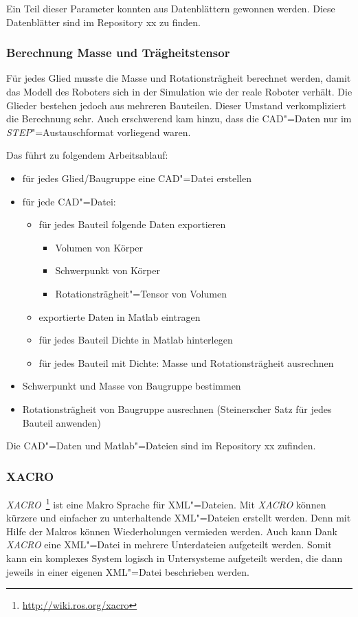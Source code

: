 Ein Teil dieser Parameter konnten aus Datenblättern gewonnen werden.
Diese Datenblätter sind im Repository xx zu finden. %

\subsubsection{Berechnung Masse und Trägheitstensor}
Für jedes Glied musste die Masse und Rotationsträgheit berechnet werden, damit das Modell des Roboters sich in der Simulation wie der reale Roboter verhält.
Die Glieder bestehen jedoch aus mehreren Bauteilen.
Dieser Umstand verkompliziert die Berechnung sehr.
Auch erschwerend kam hinzu, dass die CAD"=Daten nur im \textit{STEP}"=Austauschformat vorliegend waren.

Das führt zu folgendem Arbeitsablauf:
\begin{itemize}
\item für jedes Glied/Baugruppe eine CAD"=Datei erstellen
\item für jede CAD"=Datei:
\begin{itemize}
\item für jedes Bauteil folgende Daten exportieren
\begin{itemize}
\item Volumen von Körper
\item Schwerpunkt von Körper
\item Rotationsträgheit"=Tensor von Volumen
\end{itemize}
\item exportierte Daten in Matlab eintragen
\item für jedes Bauteil Dichte in Matlab hinterlegen
\item für jedes Bauteil mit Dichte: Masse und Rotationsträgheit ausrechnen  
\end{itemize}
\item Schwerpunkt und Masse von Baugruppe bestimmen
\item Rotationsträgheit von Baugruppe ausrechnen (Steinerscher Satz für jedes Bauteil anwenden)
\end{itemize}

Die CAD"=Daten und Matlab"=Dateien sind im Repository xx zufinden.

\subsubsection{XACRO}
\label{chap:xacro}
\textit{XACRO}~\footnote{\url{http://wiki.ros.org/xacro}} ist eine Makro Sprache für XML"=Dateien.
Mit \textit{XACRO} können kürzere und einfacher zu unterhaltende XML"=Dateien erstellt werden.
Denn mit Hilfe der Makros können Wiederholungen vermieden werden.
Auch kann Dank \textit{XACRO} eine XML"=Datei in mehrere Unterdateien aufgeteilt werden.
Somit kann ein komplexes System logisch in Untersysteme aufgeteilt werden, die dann jeweils in einer eigenen XML"=Datei beschrieben werden. 



